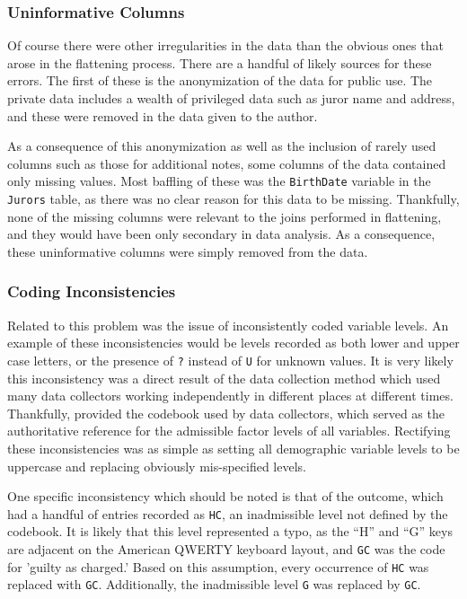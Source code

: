 \subsubsection{Uninformative Columns}

Of course there were other irregularities in the data than the obvious ones that arose in the flattening process. There are a
handful of likely sources for these errors. The first of these is the anonymization of the data for public use. The private data
includes a wealth of privileged data such as juror name and address, and these were removed in the data given to the
author.

As a consequence of this anonymization as well as the inclusion of rarely used columns such as those for additional notes, some
columns of the data contained only missing values. Most baffling of these was the \texttt{BirthDate} variable in the
\texttt{Jurors} table, as there was no clear reason for this data to be missing. Thankfully, none of the missing columns were
relevant to the joins performed in flattening, and they would have been only secondary in data analysis. As a consequence, these
uninformative columns were simply removed from the data.

\subsubsection{Coding Inconsistencies}

Related to this problem was the issue of inconsistently coded variable levels. An example of these inconsistencies would be levels
recorded as both lower and upper case letters, or the presence of \texttt{?} instead of \texttt{U} for unknown values. It is very likely
this inconsistency was a direct result of the data collection method which used many data collectors working independently in
different places at different times. Thankfully, \citeauthor{JurySunshineProj} provided the codebook used by data collectors,
which served as the authoritative reference for the admissible factor
levels of all variables. Rectifying these inconsistencies was as simple
as setting all demographic variable levels to be uppercase and replacing obviously mis-specified levels.

One specific inconsistency which should be noted is that of the outcome, which had a handful of entries recorded as \texttt{HC}, an
inadmissible level not defined by the codebook. It is likely that this level represented a typo, as the ``H'' and ``G''
keys are adjacent on the American QWERTY keyboard layout, and
\texttt{GC} was the code for 'guilty as charged.' Based on this
assumption, every
occurrence of \texttt{HC} was replaced with \texttt{GC}. Additionally, the
inadmissible level \texttt{G} was replaced by \texttt{GC}.

